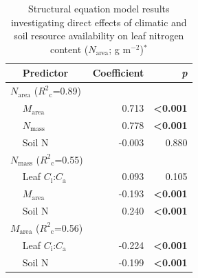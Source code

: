 \newpage
\begin{table}
    \centering
    \caption[Structural equation model results investigating direct effects of climatic and soil resource availability on leaf nitrogen content]{Structural equation model results investigating direct effects of climatic and soil resource availability on leaf nitrogen content ($N_\mathrm{area}$; g m$^{-2}$)$^*$}
        \begin{tabular}{p{0.5cm}p{3cm}p{1.5cm}p{1.5cm}}
            \hline
            & Predictor & \multicolumn{1}{r}{Coefficient} & \multicolumn{1}{r}{\textit{p}} \\
            \hline

            \multicolumn{2}{l}{$N_\mathrm{area}$ ($R^2{}_\mathrm{c}$=0.89)} && \\
            & \multicolumn{1}{l}{$M_\mathrm{area}$} & \multicolumn{1}{r}{0.713}     & \multicolumn{1}{r}{\textbf{<0.001}} \\
            & \multicolumn{1}{l}{$N_\mathrm{mass}$} & \multicolumn{1}{r}{0.778}     & \multicolumn{1}{r}{\textbf{<0.001}} \\
            & \multicolumn{1}{l}{Soil N}            & \multicolumn{1}{r}{-0.003}    & \multicolumn{1}{r}{0.880} \\
            \hline

            \multicolumn{2}{l}{$N_\mathrm{mass}$ ($R^2{}_\mathrm{c}$=0.55)} && \\
            & \multicolumn{1}{l}{Leaf $C_\mathrm{i}$:$C_\mathrm{a}$}    & \multicolumn{1}{r}{0.093}     & \multicolumn{1}{r}{0.105} \\
            & \multicolumn{1}{l}{$M_\mathrm{area}$}                     & \multicolumn{1}{r}{-0.193}    & \multicolumn{1}{r}{\textbf{<0.001}} \\
            & \multicolumn{1}{l}{Soil N}                                & \multicolumn{1}{r}{0.240}     & \multicolumn{1}{r}{\textbf{<0.001}} \\
            \hline

            \multicolumn{2}{l}{$M_\mathrm{area}$ ($R^2{}_\mathrm{c}$=0.56)} && \\
            & \multicolumn{1}{l}{Leaf $C_\mathrm{i}$:$C_\mathrm{a}$}    & \multicolumn{1}{r}{-0.224}    & \multicolumn{1}{r}{\textbf{<0.001}} \\
            & \multicolumn{1}{l}{Soil N}                                & \multicolumn{1}{r}{-0.199}    & \multicolumn{1}{r}{\textbf{<0.001}} \\
            \hline


\end{tabular}
\end{table}
